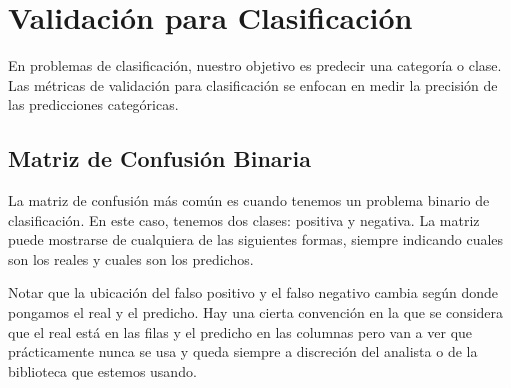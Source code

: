 \documentclass[12pt]{article}
\begin{document}
\section{Validación para Clasificación}

En problemas de clasificación, nuestro objetivo es predecir una categoría o clase. Las métricas de validación para clasificación se enfocan en medir la precisión de las predicciones categóricas.

\subsection{Matriz de Confusión Binaria}
La matriz de confusión más común es cuando tenemos un problema binario de clasificación. En este caso, tenemos dos clases: positiva y negativa. La matriz puede mostrarse de cualquiera de las siguientes formas, siempre indicando cuales son los reales y cuales son los predichos.

\begin{center}
\hspace{2cm}
\end{center}

Notar que la ubicación del falso positivo y el falso negativo cambia según donde pongamos el real y el predicho. Hay una cierta convención en la que se considera que el real está en las filas y el predicho en las columnas pero van a ver que prácticamente nunca se usa y queda siempre a discreción del analista o de la biblioteca que estemos usando.
\end{document}
